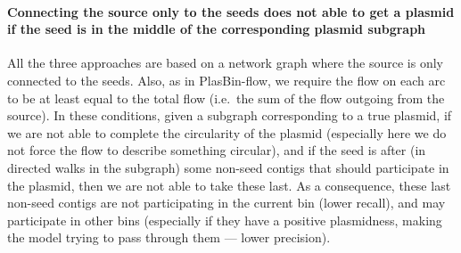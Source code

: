 \paragraph{Connecting the source only to the seeds does not able to get a plasmid if the seed is in the middle of the corresponding plasmid subgraph}
All the three approaches are based on a network graph where the source is only connected to the seeds.
Also, as in PlasBin-flow, we require the flow on each arc to be at least equal to the total flow (i.e.\ the sum of the flow outgoing from the source).
In these conditions, given a subgraph corresponding to a true plasmid, if we are not able to complete the circularity of the plasmid (especially here we do not force the flow to describe something circular), and if the seed is after (in directed walks in the subgraph) some non-seed contigs that should participate in the plasmid, then we are not able to take these last.
As a consequence, these last non-seed contigs are not participating in the current bin (lower recall), and may participate in other bins (especially if they have a positive plasmidness, making the model trying to pass through them --- lower precision).
